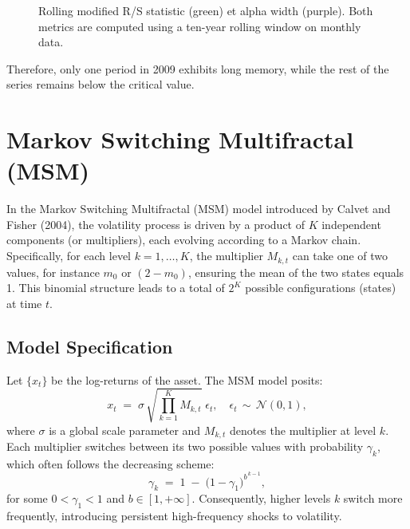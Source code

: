 \begin{figure}[htbp]
    \caption{Rolling modified R/S statistic (green) et alpha width (purple).
Both metrics are computed using a ten-year rolling window on monthly data.}
\end{figure}

\FloatBarrier

Therefore, only one period in 2009 exhibits long memory, while the rest of the series remains below the critical value.

\section{Markov Switching Multifractal (MSM)}
\label{sec:msm}

In the Markov Switching Multifractal (MSM) model introduced by Calvet and Fisher (2004), the volatility process is driven by a product of $K$ independent components (or multipliers), each evolving according to a Markov chain. Specifically, for each level $k = 1, \ldots, K$, the multiplier $M_{k,t}$ can take one of two values, for instance $m_0$ or $(2 - m_0)$, ensuring the mean of the two states equals 1. This binomial structure leads to a total of $2^K$ possible configurations (states) at time $t$.

\subsection{Model Specification}
Let $\{ x_t \}$ be the log-returns of the asset. The MSM model posits:
\begin{equation}
    x_t \;=\; \sigma \,\sqrt{\prod_{k=1}^K M_{k,t}} \;\epsilon_t,\quad
    \epsilon_t \,\sim\, \mathcal{N}(0,1),
\end{equation}
where $\sigma$ is a global scale parameter and $M_{k,t}$ denotes the multiplier at level $k$. Each multiplier switches between its two possible values with probability $\gamma_k$, which often follows the decreasing scheme:
\begin{equation}
    \label{eq:gamma_k}
    \gamma_k \;=\; 1 \;-\; \bigl(1 - \gamma_1\bigr)^{b^{\,k-1}},
\end{equation}
for some $0 < \gamma_1 < 1$ and $b \in  [1,+\infty]$. Consequently, higher levels $k$ switch more frequently, introducing persistent high-frequency shocks to volatility.



